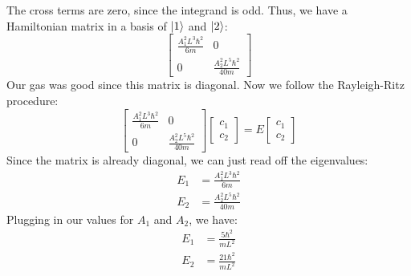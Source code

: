 \documentclass{article}
\begin{document}
The cross terms are zero, since the integrand is odd. Thus, we have a Hamiltonian matrix in a basis of $\ket{1}$ and $\ket{2}$:
\begin{equation}
    \begin{bmatrix}
    \frac{A_1^2L^3\hbar^2}{6m} & 0 \\
    0 & \frac{A_2^2L^5\hbar^2}{40m}
    \end{bmatrix}
\end{equation}
Our gas was good since this matrix is diagonal. Now we follow the Rayleigh-Ritz procedure:
\begin{equation}
    \begin{bmatrix}
    \frac{A_1^2L^3\hbar^2}{6m} & 0 \\
    0 & \frac{A_2^2L^5\hbar^2}{40m}
    \end{bmatrix}
    \begin{bmatrix}
    c_1 \\
    c_2
    \end{bmatrix}
    = E
    \begin{bmatrix}
    c_1 \\
    c_2
    \end{bmatrix}
\end{equation}
Since the matrix is already diagonal, we can just read off the eigenvalues:
\begin{align}
    E_1 &= \frac{A_1^2L^3\hbar^2}{6m} \\
    E_2 &= \frac{A_2^2L^5\hbar^2}{40m}
\end{align}
Plugging in our values for $A_1$ and $A_2$, we have:
\begin{align}
    E_1 &= \frac{5\hbar^2}{mL^2} \\
    E_2 &= \frac{21\hbar^2}{mL^2}
\end{align}
\end{document}

